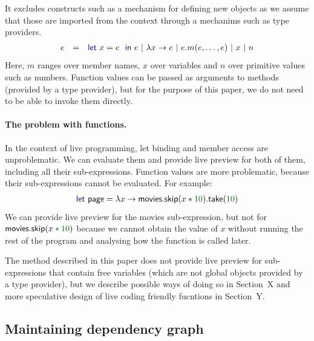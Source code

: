\documentclass[sigplan,10pt]{acmart}\settopmatter{printfolios=true,printccs=false,printacmref=false}
\theoremstyle{plain}
\theoremstyle{definition}
\newcommand{\num}[1]{\textcolor{numclr}{#1}}
\newcommand{\ident}[1]{\textnormal{\sffamily #1}}
\newcommand{\kvd}[1]{\textnormal{\textcolor{kvdclr}{\sffamily #1}}}
\begin{document}
It excludes constructs such as a mechanism for defining new objects as we assume that those
are imported from the context through a mechanims such as type providers.
%
\begin{equation*}
\begin{array}{lcl}
e &=& \kvd{let}~x = e~\kvd{in}~e ~|~ \lambda x\rightarrow e ~|~ e.m(e, \ldots, e) ~|~ x ~|~ n
\end{array}
\end{equation*}
%
Here, $m$ ranges over member names, $x$ over variables and $n$ over primitive values such as 
numbers. Function values can be passed as arguments to methods (provided by a type provider), but 
for the purpose of this paper, we do not need to be able to invoke them directly.

\paragraph{The problem with functions.}
In the context of live programming, \kvd{let} binding and member access are unproblematic.
We can evaluate them and provide live preview for both of them, including all their sub-expressions.
Function values are more problematic, because their sub-expressions cannot be evaluated. For example:
%
\begin{equation*}
\begin{array}{l}
\kvd{let}~\ident{page} = \lambda x \rightarrow \ident{movies}.\ident{skip}(x*\num{10}).\ident{take}(\num{10})
\end{array}
\end{equation*}
%
We can provide live preview for the \ident{movies} sub-expression, but not for 
$\ident{movies}.\ident{skip}(x*\num{10})$ because we cannot obtain the value of $x$ without
running the rest of the program and analysing how the function is called later.

The method described in this paper does not provide live preview for sub-expressions that
contain free variables (which are not global objects provided by a type provider), but we
describe possible ways of doing so in Section~X and more speculative design of live coding 
friendly fucntions in Section~Y.


\subsection{Maintaining dependency graph}
\label{sec:formal-deps}
\end{document}
